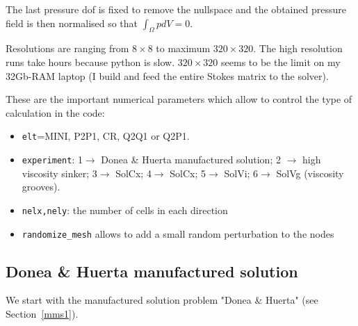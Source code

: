 The last pressure dof is fixed to remove the nullspace and the obtained pressure field
is then normalised so that $\int_\Omega p dV = 0$.

Resolutions are ranging from $8\times 8$ to maximum $320\times320$. The high resolution runs take hours 
because python is slow. $320\times 320$ seems to be the limit on my 32Gb-RAM laptop (I build and feed 
the entire Stokes matrix to the solver).  

These are the important numerical parameters which allow to control the type of calculation in the code:
\begin{itemize}
\item {\tt elt}=MINI, P2P1, CR, Q2Q1 or Q2P1.
\item {\tt experiment}: 1$\rightarrow$ Donea \& Huerta manufactured solution;
2 $\rightarrow$ high viscosity sinker; 3$\rightarrow$ SolCx; 4$\rightarrow$ SolCx; 
5$\rightarrow$ SolVi; 6$\rightarrow$ SolVg (viscosity grooves).
\item {\tt nelx,nely}:  the number of cells in each direction
\item {\tt randomize\_mesh} allows to add a small random perturbation to the nodes
\end{itemize}

\newpage
\subsection*{Donea \& Huerta manufactured solution}

We start with the manufactured solution problem "Donea \& Huerta" (see Section~\ref{mms1}).

